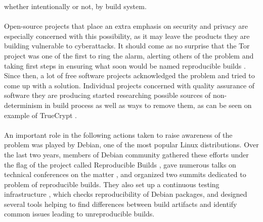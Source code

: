 {whether intentionally or not, by build system. \\\\
Open-source projects that place an extra emphasis on security
and privacy are especially concerned with this possibility, as
it may leave the products they are building vulnerable to cyberattacks.
It should come as no surprise that the Tor project was one of the
first to ring the alarm, alerting others of the problem and taking first steps
in ensuring what soon would be named reproducible builds \autocite{tor13, tor14}.
Since then, a lot of free software projects acknowledged the problem and
tried to come up with a solution. Individual projects concerned with quality
assurance of software they are producing started researching possible sources of
non-determinism in build process as well as ways to remove them, as can be
seen on example of TrueCrypt \autocite{de2014challenges}.\\\\
An important role in the following actions taken to raise awareness of the
problem was played by Debian, one of the most popular Linux distributions.
Over the last two years, members of Debian community gathered these efforts
under the flag of the project called Reproducible Builds \autocite{rb},
gave numerous talks on technical conferences on the matter
\autocite{Lun14, lca2017_valerie}, and organized
two summits dedicated to problem of reproducible builds. They also set up a continuous
testing infrastructure \autocite{tests-rbo}, which checks reproducibility
of Debian packages, and designed several tools helping to find
differences between build artifacts and identify common issues leading to
unreproducible builds.}

